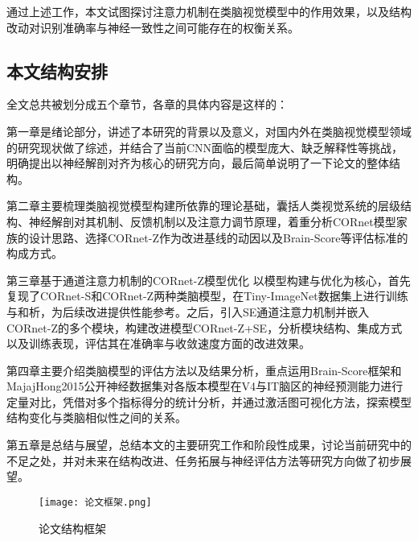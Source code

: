通过上述工作，本文试图探讨注意力机制在类脑视觉模型中的作用效果，以及结构改动对识别准确率与神经一致性之间可能存在的权衡关系。

\subsection{本文结构安排}

全文总共被划分成五个章节，各章的具体内容是这样的：

第一章是绪论部分，讲述了本研究的背景以及意义，对国内外在类脑视觉模型领域的研究现状做了综述，并结合了当前CNN面临的模型庞大、缺乏解释性等挑战，明确提出以神经解剖对齐为核心的研究方向，最后简单说明了一下论文的整体结构。

第二章主要梳理类脑视觉模型构建所依靠的理论基础，囊括人类视觉系统的层级结构、神经解剖对其机制、反馈机制以及注意力调节原理，着重分析CORnet模型家族的设计思路、选择CORnet-Z作为改进基线的动因以及Brain-Score等评估标准的构成方式。

第三章基于通道注意力机制的CORnet-Z模型优化 以模型构建与优化为核心，首先复现了CORnet-S和CORnet-Z两种类脑模型，在Tiny-ImageNet数据集上进行训练与和析，为后续改进提供性能参考。之后，引入SE通道注意力机制并嵌入CORnet-Z的多个模块，构建改进模型CORnet-Z+SE，分析模块结构、集成方式以及训练表现，评估其在准确率与收敛速度方面的改进效果。

第四章主要介绍类脑模型的评估方法以及结果分析，重点运用Brain-Score框架和MajajHong2015公开神经数据集对各版本模型在V4与IT脑区的神经预测能力进行定量对比，凭借对多个指标得分的统计分析，并通过激活图可视化方法，探索模型结构变化与类脑相似性之间的关系。

第五章是总结与展望，总结本文的主要研究工作和阶段性成果，讨论当前研究中的不足之处，并对未来在结构改进、任务拓展与神经评估方法等研究方向做了初步展望。

\begin{figure}[hbt]
	\centering
	\texttt{[image: 论文框架.png]}
	\caption{论文结构框架}
	\label{f.lunwenkuangjia}
\end{figure}
